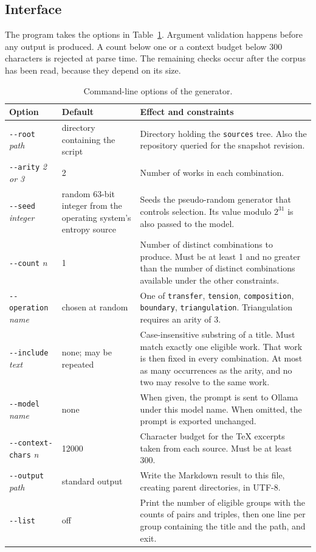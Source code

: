 \documentclass[11pt]{article}
\begin{document}
\subsection{Interface}

The program takes the options in Table~\ref{tab:options}. Argument validation happens before any output is produced. A count below one or a context budget below 300 characters is rejected at parse time. The remaining checks occur after the corpus has been read, because they depend on its size.

\begin{table}[h]
\centering
\small
\begin{tabular}{|p{2.6cm}|p{3.2cm}|p{8.2cm}|}
\hline
\textbf{Option} & \textbf{Default} & \textbf{Effect and constraints} \\ \hline
\texttt{-{}-root} \emph{path} & directory containing the script & Directory holding the \texttt{sources} tree. Also the repository queried for the snapshot revision. \\ \hline
\texttt{-{}-arity} \emph{2 or 3} & 2 & Number of works in each combination. \\ \hline
\texttt{-{}-seed} \emph{integer} & random 63-bit integer from the operating system's entropy source & Seeds the pseudo-random generator that controls selection. Its value modulo $2^{31}$ is also passed to the model. \\ \hline
\texttt{-{}-count} \emph{n} & 1 & Number of distinct combinations to produce. Must be at least 1 and no greater than the number of distinct combinations available under the other constraints. \\ \hline
\texttt{-{}-operation} \emph{name} & chosen at random & One of \texttt{transfer}, \texttt{tension}, \texttt{composition}, \texttt{boundary}, \texttt{triangulation}. Triangulation requires an arity of 3. \\ \hline
\texttt{-{}-include} \emph{text} & none; may be repeated & Case-insensitive substring of a title. Must match exactly one eligible work. That work is then fixed in every combination. At most as many occurrences as the arity, and no two may resolve to the same work. \\ \hline
\texttt{-{}-model} \emph{name} & none & When given, the prompt is sent to Ollama under this model name. When omitted, the prompt is exported unchanged. \\ \hline
\texttt{-{}-context-chars} \emph{n} & 12000 & Character budget for the \TeX{} excerpts taken from each source. Must be at least 300. \\ \hline
\texttt{-{}-output} \emph{path} & standard output & Write the Markdown result to this file, creating parent directories, in UTF-8. \\ \hline
\texttt{-{}-list} & off & Print the number of eligible groups with the counts of pairs and triples, then one line per group containing the title and the path, and exit. \\ \hline
\end{tabular}
\caption{Command-line options of the generator.}
\label{tab:options}
\end{table}
\end{document}
